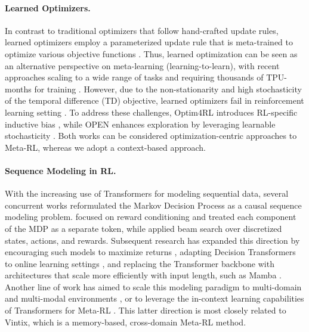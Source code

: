 \documentclass{article}
\theoremstyle{plain}
\theoremstyle{definition}
\theoremstyle{remark}
\begin{document}
\paragraph{Learned Optimizers.} In contrast to traditional optimizers that follow hand-crafted update rules, learned optimizers employ a parameterized update rule that is meta-trained to optimize various objective functions \cite{li2016learningoptimize, andrychowicz2016learninglearngradientdescent, metz2020tasksstabilityarchitecturecompute, almeida2021generalizableapproachlearningoptimizers}. Thus, learned optimization can be seen as an alternative perspective on meta-learning (learning-to-learn), with recent approaches scaling to a wide range of tasks and requiring thousands of TPU-months for training \cite{metz2022velotrainingversatilelearned}. However, due to the non-stationarity and high stochasticity of the temporal difference (TD) objective, learned optimizers fail in reinforcement learning setting \cite{metz2022velotrainingversatilelearned}. To address these challenges, Optim4RL introduces RL-specific inductive bias \cite{lan2024learningoptimizereinforcementlearning}, while OPEN enhances exploration by leveraging learnable stochasticity \cite{goldie2024learnedoptimizationmakereinforcement}. Both works can be considered optimization-centric approaches to Meta-RL, whereas we adopt a context-based approach.
\paragraph{Sequence Modeling in RL.} With the increasing use of Transformers for modeling sequential data, several concurrent works \cite{chen2021decisiontransformerreinforcementlearning, janner2021offlinereinforcementlearningbig} reformulated the Markov Decision Process as a causal sequence modeling problem. \citet{chen2021decisiontransformerreinforcementlearning} focused on reward conditioning and treated each component of the MDP as a separate token, while \citet{janner2021offlinereinforcementlearningbig} applied beam search over discretized states, actions, and rewards.
Subsequent research has expanded this direction by encouraging such models to maximize returns \cite{zhuang2024reinformermaxreturnsequencemodeling}, adapting Decision Transformers to online learning settings \cite{zheng2022onlinedecisiontransformer}, and replacing the Transformer backbone with architectures that scale more efficiently with input length, such as Mamba \cite{huang2024decisionmambareinforcementlearning}.
Another line of work has aimed to scale this modeling paradigm to multi-domain and multi-modal environments \cite{reed2022generalistagent, gallouédec2024jacktradesmastersome}, or to leverage the in-context learning capabilities of Transformers for Meta-RL \cite{laskin2022incontextreinforcementlearningalgorithm, lee2023supervisedpretraininglearnincontext}. This latter direction is most closely related to Vintix, which is a memory-based, cross-domain Meta-RL method.
\end{document}
